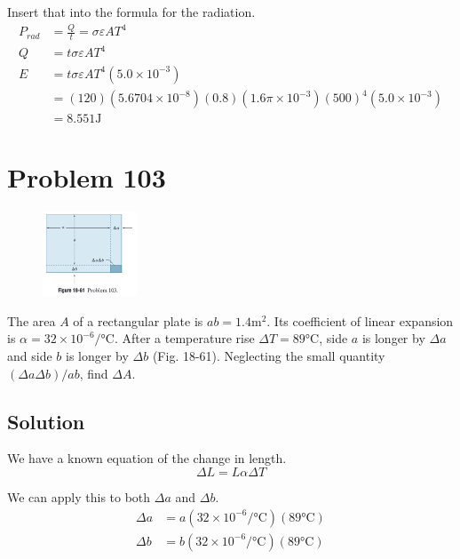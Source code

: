 \documentclass[12pt]{article}
\begin{document}
            Insert that into the formula for the radiation.
            \begin{align}
                P_{rad} &=  \frac{Q}{t} =   \sigma\varepsilon A T^4\\
                Q   &=  t\sigma\varepsilon A T^4\\
                E   &=  t\sigma\varepsilon A T^4 (5.0 \times 10^{-3})\\
                    &=  (120) (5.6704 \times 10^{-8}) (0.8) (1.6 \pi \times 10^{-3}) (500)^4  (5.0 \times 10^{-3})\\
                    &=  \boxed{8.551 \unit{\joule}}
            \end{align}

    \pagebreak
    \section{Problem 103}
        \begin{figure}
            \vspace{-30pt}
            \includegraphics[width=0.25\textwidth]{picture_18-61.png} 
        \end{figure}
        The area $A$ of a rectangular plate is $ab = 1.4 \unit{\meter^2}$. 
        Its coefficient of linear expansion is $\alpha = 32 \times 10^{-6} /\unit{\celsius}$. 
        After a temperature rise $\Delta T = 89\unit{\celsius}$, side $a$ is longer by $\Delta a$ and side $b$ is longer by $\Delta b$ (Fig. 18-61). 
        Neglecting the small quantity $(\Delta a \Delta b)/ab$, find $\Delta A$. 

        \subsection{Solution}
            We have a known equation of the change in length.
            \begin{equation}
                \Delta L    =   L \alpha \Delta T
            \end{equation}

            We can apply this to both $\Delta a$ and $\Delta b$.
            \begin{align}
                \Delta a    &=  a (32 \times 10^{-6} /\unit{\celsius}) (89 \unit{\celsius})\\
                \Delta b    &=  b (32 \times 10^{-6} /\unit{\celsius}) (89 \unit{\celsius})
            \end{align}
\end{document}
